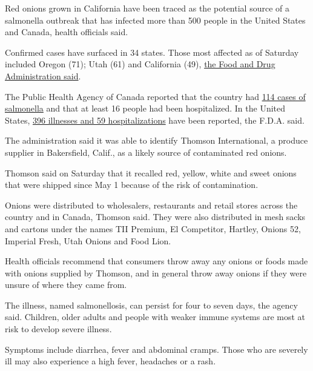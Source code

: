 Red onions grown in California have been traced as the potential source
of a salmonella outbreak that has infected more than 500 people in the
United States and Canada, health officials said.

Confirmed cases have surfaced in 34 states. Those most affected as of
Saturday included Oregon (71); Utah (61) and California (49),
\href{https://www.fda.gov/food/outbreaks-foodborne-illness/outbreak-investigation-salmonella-newport-red-onions-july-2020?utm_campaign=OutbreakAlert_SalmonellaOnion_07312020\&utm_medium=email\&utm_source=Eloqua}{the
Food and Drug Administration said}.

The Public Health Agency of Canada reported that the country had
\href{https://www.canada.ca/en/public-health/services/public-health-notices/2020/outbreak-salmonella-infections-under-investigation.html}{114
cases of salmonella} and that at least 16 people had been hospitalized.
In the United States,
\href{https://www.fda.gov/food/outbreaks-foodborne-illness/outbreak-investigation-salmonella-newport-red-onions-july-2020?utm_campaign=OutbreakAlert_SalmonellaOnion_07312020\&utm_medium=email\&utm_source=Eloqua}{396
illnesses and 59 hospitalizations} have been reported, the F.D.A. said.

The administration said it was able to identify Thomson International, a
produce supplier in Bakersfield, Calif., as a likely source of
contaminated red onions.

Thomson said on Saturday that it recalled red, yellow, white and sweet
onions that were shipped since May 1 because of the risk of
contamination.

Onions were distributed to wholesalers, restaurants and retail stores
across the country and in Canada, Thomson said. They were also
distributed in mesh sacks and cartons under the names TII Premium, El
Competitor, Hartley, Onions 52, Imperial Fresh, Utah Onions and Food
Lion.

Health officials recommend that consumers throw away any onions or foods
made with onions supplied by Thomson, and in general throw away onions
if they were unsure of where they came from.

The illness, named salmonellosis, can persist for four to seven days,
the agency said. Children, older adults and people with weaker immune
systems are most at risk to develop severe illness.

Symptoms include diarrhea, fever and abdominal cramps. Those who are
severely ill may also experience a high fever, headaches or a rash.

